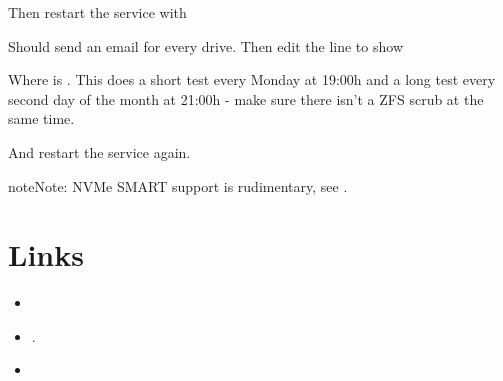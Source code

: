 \documentclass[a4paper,10pt,english]{sphinxmanual}
\begin{document}
\begin{sphinxVerbatim}[commandchars=\\\{\}]
    
\end{sphinxVerbatim}

Then restart the service with

\begin{sphinxVerbatim}[commandchars=\\\{\}]
   
\end{sphinxVerbatim}

Should send an email for every drive. Then edit the line to show

\begin{sphinxVerbatim}[commandchars=\\\{\}]
     
\end{sphinxVerbatim}

Where  is . This does a
short test every Monday at 19:00h and a long test every second day of the month
at 21:00h - make sure there isn’t a ZFS scrub at the same time.

\begin{sphinxVerbatim}[commandchars=\\\{\}]
   
\end{sphinxVerbatim}

And restart the service again.

\begin{sphinxadmonition}{note}{Note:}
NVMe SMART support is rudimentary, see .
\end{sphinxadmonition}


\section{Links}
\label{\detokenize{smart:links}}\begin{itemize}
\item {} 

\item {} 
.

\item {} 

\end{itemize}
\end{document}
